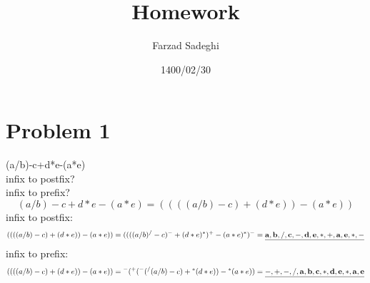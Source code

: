 \documentclass{article}
\title{Homework}
\author{Farzad Sadeghi}
\date{1400/02/30}
\begin{document}
\maketitle
\section{Problem 1}

(a/b)-c+d*e-(a*e)\\
infix to postfix?\\
infix to prefix?\\
\begin{equation*}
  (a/b)-c+d*e-(a*e) = ((((a/b)-c)+(d*e))-(a*e))
\end{equation*}
infix to postfix:\\
\begin{equation*}
  ((((a/b)-c)+(d*e))-(a*e)) = ((((a/b)^/-c)^-+(d*e)^*)^+-(a*e)^*)^- = \underline{\bf a,b,/,c,-,d,e,*,+,a,e,*,-}
\end{equation*}
infix to prefix:\\
\begin{equation*}
  ((((a/b)-c)+(d*e))-(a*e)) = {}^-({}^+({}^-({}^/(a/b)-c)+{}^*(d*e))-{}^*(a*e)) = \underline{\bf -,+,-,/,a,b,c,*,d,e,*,a,e}
\end{equation*}
\end{document}
